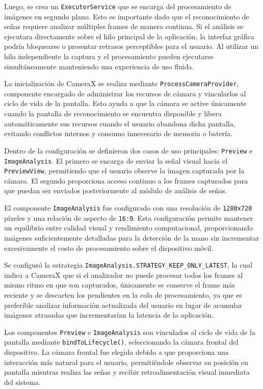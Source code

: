 	Luego, se crea un \texttt{ExecutorService} que se encarga del procesamiento de imágenes en segundo plano. Esto es importante dado que el reconocimiento de señas requiere analizar múltiples frames de manera continua. Si el análisis se ejecutara directamente sobre el hilo principal de la aplicación, la interfaz gráfica podría bloquearse o presentar retrasos perceptibles para el usuario. Al utilizar un hilo independiente la captura y el procesamiento pueden ejecutarse simultáneamente manteniendo una experiencia de uso fluida.
	
	La inicialización de CameraX se realiza mediante \texttt{ProcessCameraProvider}, componente encargado de administrar los recursos de cámara y vincularlos al ciclo de vida de la pantalla. Esto ayuda a que la cámara se active únicamente cuando la pantalla de reconocimiento se encuentra disponible y libera automáticamente sus recursos cuando el usuario abandona dicha pantalla, evitando conflictos internos y consumo innecesario de memoria o batería.
	
	Dentro de la configuración se definieron dos casos de uso principales: \texttt{Preview} e \texttt{ImageAnalysis}. El primero se encarga de enviar la señal visual hacia el \texttt{PreviewView}, permitiendo que el usuario observe la imagen capturada por la cámara. El segundo proporciona acceso continuo a los frames capturados para que puedan ser enviados posteriormente al módulo de análisis de señas.
	
	El componente \texttt{ImageAnalysis} fue configurado con una resolución de \texttt{1280x720} píxeles y una relación de aspecto de \texttt{16:9}. Esta configuración permite mantener un equilibrio entre calidad visual y rendimiento computacional, proporcionando imágenes suficientemente detalladas para la detección de la mano sin incrementar excesivamente el costo de procesamiento sobre el dispositivo móvil.
	
	Se configuró la estrategia \texttt{ImageAnalysis.STRATEGY\_KEEP\_ONLY\_LATEST}, la cual indica a CameraX que si el analizador no puede procesar todos los frames al mismo ritmo en que son capturados, únicamente se conserve el frame más reciente y se descarten los pendientes en la cola de procesamiento, ya que es preferible analizar información actualizada del usuario en lugar de acumular imágenes atrasadas que incrementarían la latencia de la aplicación.
	
	Los componentes \texttt{Preview} e \texttt{ImageAnalysis} son vinculados al ciclo de vida de la pantalla mediante \texttt{bindToLifecycle()}, seleccionando la cámara frontal del dispositivo. La cámara frontal fue elegida debido a que proporciona una interacción más natural para el usuario, permitiéndole observar su posición en pantalla mientras realiza las señas y recibir retroalimentación visual inmediata del sistema.
	
